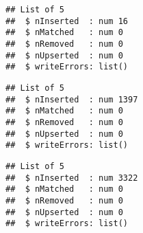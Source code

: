 \documentclass[]{article}
\newenvironment{Shaded}{\begin{snugshade}}{\end{snugshade}}
\newcommand{\KeywordTok}[1]{\textcolor[rgb]{0.13,0.29,0.53}{\textbf{#1}}}
\newcommand{\DataTypeTok}[1]{\textcolor[rgb]{0.13,0.29,0.53}{#1}}
\newcommand{\StringTok}[1]{\textcolor[rgb]{0.31,0.60,0.02}{#1}}
\newcommand{\CommentTok}[1]{\textcolor[rgb]{0.56,0.35,0.01}{\textit{#1}}}
\newcommand{\OperatorTok}[1]{\textcolor[rgb]{0.81,0.36,0.00}{\textbf{#1}}}
\newcommand{\NormalTok}[1]{#1}
\begin{document}
\begin{Shaded}
\end{Shaded}

\begin{verbatim}
## List of 5
##  $ nInserted  : num 16
##  $ nMatched   : num 0
##  $ nRemoved   : num 0
##  $ nUpserted  : num 0
##  $ writeErrors: list()
\end{verbatim}

\begin{Shaded}
\end{Shaded}

\begin{verbatim}
## List of 5
##  $ nInserted  : num 1397
##  $ nMatched   : num 0
##  $ nRemoved   : num 0
##  $ nUpserted  : num 0
##  $ writeErrors: list()
\end{verbatim}

\begin{Shaded}
\end{Shaded}

\begin{verbatim}
## List of 5
##  $ nInserted  : num 3322
##  $ nMatched   : num 0
##  $ nRemoved   : num 0
##  $ nUpserted  : num 0
##  $ writeErrors: list()
\end{verbatim}
\end{document}
